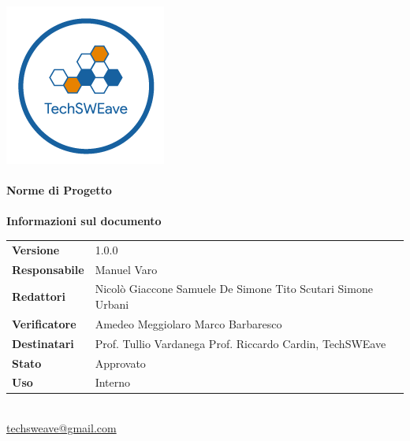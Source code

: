 \documentclass[a4paper]{article}
\begin{document}
\begin{titlepage}
    \begin{center}
        \includegraphics{../../../Images/logo}\\
        \vspace{20px}
        \textcolor{logo}{\hrulefill}\\
        \vspace{20px}
        \textbf{\huge\textcolor{logo}{Norme di Progetto}}\\
        \vspace{10px}
        \textcolor{logo}{\hrulefill}\\
        \vspace{40px}
        \textbf{\Large Informazioni sul documento}\\
        \vspace{20px}
        \begin{tabular}{p{100px} | p{100px}}
            \textbf{Versione}     & 1.0.0                                                                                   \\
            \textbf{Responsabile} & Manuel Varo                                                                             \\
            \textbf{Redattori}    & Nicolò Giaccone \newline Samuele De Simone \newline Tito Scutari \newline Simone Urbani \\
            \textbf{Verificatore} & Amedeo Meggiolaro \newline Marco Barbaresco                                             \\
            \textbf{Destinatari}  & Prof. Tullio Vardanega \newline Prof. Riccardo Cardin, \newline TechSWEave              \\
            \textbf{Stato}        & Approvato                                                                               \\
            \textbf{Uso}          & Interno                                                                                 \\
        \end{tabular}\\
        \vspace{60px}
        \href{mailto:techsweave@gmail.com}{techsweave@gmail.com}\\
    \end{center}
\end{titlepage}
\end{document}
